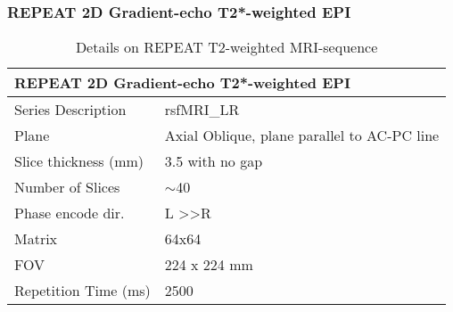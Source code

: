 \documentclass[
	a4paper, 
	11.5pt,
	headings=small, 
	twoside, 
	titlepage=firstiscover, 
 	pagesize=auto,
  	version=last,
	open=any,
	BCOR=14mm,
  	chapterprefix=false]{scrbook}
\begin{document}
\subsubsection{REPEAT 2D Gradient-echo T2*-weighted EPI}
\begin{table}[H]
\caption{Details on REPEAT T2-weighted \ac{MRI}-sequence}
\begin{tabularx}{1\textwidth}{@{}X *{1}{X}@{}}
\toprule
\multicolumn{2}{l}{\textbf{REPEAT 2D Gradient-echo T2*-weighted \ac{EPI}}} \\
\midrule                                                                                                                                                                                                                                                                                                                                                                                                                                                                                                                                                                                                                                                                                                                          
Series Description                                                                	& rsfMRI\_LR                                  \\
Plane                                                                                      	& Axial Oblique, plane parallel to AC-PC line \\
Slice thickness (mm)                                                          	& 3.5 with no gap                             \\
Number of Slices                                                      		& $\sim$40                                    \\
Phase encode dir.                                                                 	& L \textgreater{}\textgreater R              \\
Matrix                                                                                     	& 64x64                                       \\
FOV                                                                                        	& 224 x 224 mm                                \\
Repetition Time (ms)                                                             & 2500                                        \\

\end{tabularx}
\end{table}
\end{document}
